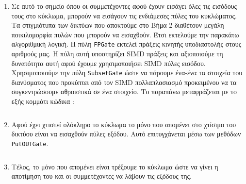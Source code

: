\begin{enumerate}
\begin{longlisting}
\begin{center}
            \inputminted[fontsize=\scriptsize,frame=single]{cpp}{./01_body/code/aby-example-step-3.cpp}
        \end{center}
    \end{longlisting}
    Είναι σχεδόν προφανές ότι ο παραπάνω κώδικας μπορεί να βελτιωθεί θεωρώντας μια συνάρτηση και περνώντας σαν ορίσματα σε αυτή τα \texttt{N, X, incX} και \texttt{N, Y, incY}, ωστόσο για να μη γίνει δυσανάγνωστη η εργασία προτιμήσαμε την πιο απλή του μορφή\footnote{Βελτιστοποιήσεις όπως αυτή, αξιοποιούνται μαζικά στον κώδικα της MPC-BLAS, που θα εξετάσουμε στη συνέχεια, καθώς παρατηρήθηκε πως κατά την υλοποίηση της υπάρχει μεγάλη επαναληψημότητα αλγοριθμικής λογικής.}.
    \item Σε αυτό το σημείο όπου οι συμμετέχοντες αφού έχουν εισάγει όλες τις εισόδους τους στο κύκλωμα, μπορούν να εισάγουν τις ενδιάμεσες πύλες του κυκλώματος. Τα στιγμιότυπα των δικτύων που αποκτούμε στο Βήμα 2 διαθέτουν μεγάλη ποικιλομορφία πυλών που μπορούν να εισαχθούν. Έτσι εκτελούμε την παρακάτω αλγοριθμική λογική. Η πύλη \texttt{FPGate} εκτελεί πράξεις κινητής υποδιαστολής στους αριθμούς μας. Η πύλη αυτή υποστηρίζει SIMD πράξεις και αξιοποιούμε τη δυνατότητα αυτή αφού έχουμε χρησιμοποιήσει SIMD πύλες εισόδου. Χρησιμοποιούμε την πύλη \texttt{SubsetGate} ώστε να πάρουμε ένα-ένα τα στοιχεία του διανύσματος που προκύπτει από τον SIMD πολλαπλασιασμό προκειμένου να τα συγκεντρώσουμε αθροιστικά σε ένα στοιχείο. Το παραπάνω μεταφράζεται με το εξής κομμάτι κώδικα :
    \begin{longlisting}
        \begin{center}
            \inputminted[fontsize=\scriptsize,frame=single]{cpp}{./01_body/code/aby-example-step-4.cpp}
        \end{center}
    \end{longlisting}
    \item Αφού έχει χτιστεί ολόκληρο το κύκλωμα το μόνο που απομένει στο χτίσιμο του δικτύου είναι να εισαχθούν πύλες εξόδου. Αυτό επιτυγχάνεται μέσω των μεθόδων \texttt{PutOUTGate}.
    \begin{longlisting}
        \begin{center}
            \inputminted[fontsize=\scriptsize,frame=single]{cpp}{./01_body/code/aby-example-step-5.cpp}
        \end{center}
    \end{longlisting}
    \item Τέλος, το μόνο που απομένει είναι τρέξουμε το κύκλωμα ώστε να γίνει η αποτίμηση του και οι συμμετέχοντες να λάβουν τις εξόδους της.
    \begin{longlisting}
        \begin{center}
            \inputminted[fontsize=\scriptsize,frame=single]{cpp}{./01_body/code/aby-example-step-6.cpp}
        \end{center}
    \end{longlisting}
\end{enumerate}


